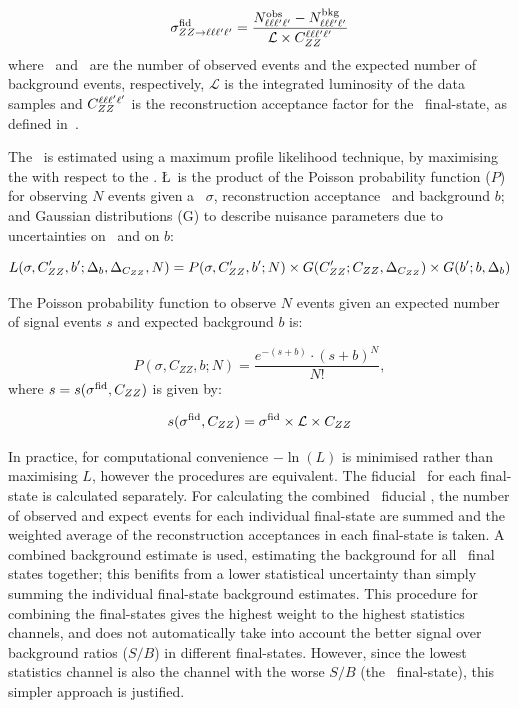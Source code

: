 \begin{equation}\label{eq:xsecfid_fourl}
\sigma_{ZZ\rightarrow\ell\ell\ell'\ell'}^{\rm fid} = \frac{N^{\rm obs}_{\ell\ell\ell'\ell'} - N^{\rm bkg}_{\ell\ell\ell'\ell'}}{\mathcal{L} \times C_{ZZ}^{\ell\ell\ell'\ell'}}
\end{equation}
where \NObs\ and \NBg\ are the number of observed events and the expected number
of background events, respectively, $\mathcal{L}$ is the integrated luminosity
of the data samples and
$C_{ZZ}^{\ell\ell\ell'\ell'}$ is the reconstruction acceptance factor for the \lllplp\
final-state, as defined in~.

The \cx\ is estimated using a maximum profile likelihood technique, by
maximising the \intro{profile likelihood function, \L} with respect to the \cx.
\L\ is the product of the Poisson probability function ($P$) for observing $N$ events given a
\cx\ $\sigma$, reconstruction acceptance \CZZ\ and background $b$; and Gaussian
distributions (G) to describe nuisance parameters due to uncertainties on \CZZ\
and on $b$:

\begin{equation}
\small
   L(\sigma, C_{ZZ}', b'; \Delta_{b}, \Delta_{C_{ZZ}}, N) = P(\sigma, C_{ZZ}^\prime,
   b^\prime; N)\times G(C_{ZZ}^\prime; C_{ZZ}, \Delta_{C_{ZZ}}) \times G(b^\prime; b, \Delta_{b})
\end{equation}

The Poisson probability function to observe $N$ events given an expected
number of signal events $s$ and expected background $b$ is:

\begin{equation}
P(\sigma, C_{ZZ}, b; N) =
\frac{e^{-(s+b)}\cdot
     \left(s+b\right)^{N}}
     {N!},
\end{equation}
where $s=s(\sigma^{\rm fid}, C_{ZZ})$ is given by:

\begin{equation}
   s(\sigma^{\rm fid}, C_{ZZ}) = \sigma^{\rm fid}\times\mathcal{L}\times C_{ZZ} \\
\end{equation}

In practice, for computational convenience $-\ln(L)$ is minimised rather
than maximising $L$, however the procedures are equivalent. The fiducial
\cx\ for each final-state is calculated separately. For calculating the combined \ZZllll\
fiducial \cx, the number of observed and expect events for each individual
final-state are summed and the weighted average of the reconstruction
acceptances in each final-state is taken. A combined background estimate is used,
estimating the background for all \llll\ final states together; this benifits from a
lower statistical uncertainty than simply summing the individual final-state background
estimates. This procedure for combining the final-states gives the highest weight to the highest
statistics channels, and does not automatically take into account the better
signal over background ratios ($S/B$) in different final-states. However, since the
lowest statistics channel is also the channel with the worse $S/B$ (the \eeee\
final-state), this simpler approach is justified.

